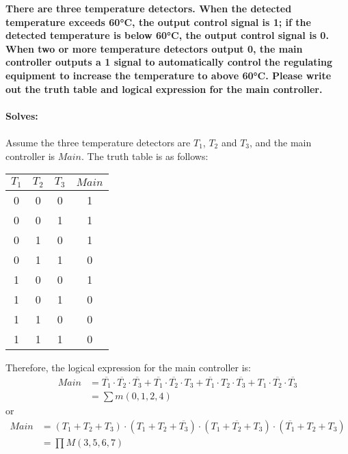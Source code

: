 \documentclass{article}
\begin{document}
\textbf{There are three temperature detectors. When the detected temperature exceeds 60°C, the output control signal is 1; if the detected temperature is below 60°C, the output control signal is 0. When two or more temperature detectors output 0, the main controller outputs a 1 signal to automatically control the regulating equipment to increase the temperature to above 60°C. Please write out the truth table and logical expression for the main controller.}\\
\\
\textbf{Solves:}\\
\\
Assume the three temperature detectors are $T_1$, $T_2$ and $T_3$, and the main controller is $Main$. The truth table is as follows:
\begin{table}[H]
    \centering
    \begin{tabular}{|c|c|c|c|}
        \hline
        $T_1$ & $T_2$ & $T_3$ & $Main$ \\ \hline
        0     & 0     & 0     & 1      \\ \hline
        0     & 0     & 1     & 1      \\ \hline
        0     & 1     & 0     & 1      \\ \hline
        0     & 1     & 1     & 0      \\ \hline
        1     & 0     & 0     & 1      \\ \hline
        1     & 0     & 1     & 0      \\ \hline
        1     & 1     & 0     & 0      \\ \hline
        1     & 1     & 1     & 0      \\ \hline
    \end{tabular}
\end{table}
Therefore, the logical expression for the main controller is:
\begin{align}
    Main & = \overline{T_1} \cdot \overline{T_2} \cdot \overline{T_3} + \overline{T_1} \cdot \overline{T_2} \cdot T_3 + \overline{T_1} \cdot T_2 \cdot \overline{T_3} + T_1 \cdot \overline{T_2} \cdot \overline{T_3} \\
         & = \sum m(0,1,2,4)
\end{align}
or
\begin{align}
    Main & = (T_1 + T_2 + T_3)\cdot (T_1 + T_2 + \overline{T_3})\cdot (T_1 + \overline{T_2} + T_3)\cdot (\overline{T_1} + T_2 + T_3) \\
         & = \prod M(3,5,6,7)
\end{align}
\end{document}
